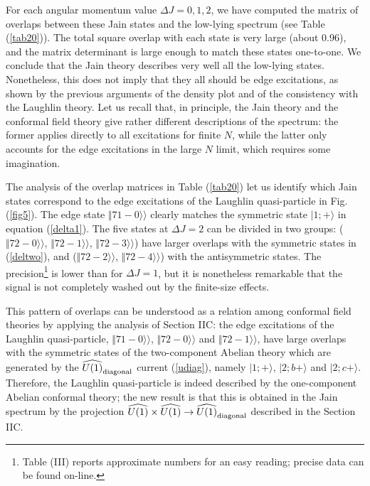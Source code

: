 For each angular momentum value $\Delta J=0,1,2$, we have computed 
the matrix of overlaps between these Jain states and the
low-lying spectrum (see Table (\ref{tab20})). The total square overlap with
each state is very large (about 0.96), and the matrix determinant 
is large enough to match these states one-to-one.
We conclude that the Jain theory describes very well all the 
low-lying states.
Nonetheless, this does not imply that they all should be
edge excitations, as shown by the previous arguments of the density
plot and of the consistency with the Laughlin theory.
Let us recall that, in principle, the Jain theory and the 
conformal field theory give rather different descriptions of the spectrum:
the former applies directly to all excitations for
finite $N$, while the latter only accounts for the edge excitations
in the large $N$ limit, which requires some imagination.

The analysis of the overlap matrices in Table (\ref{tab20}) let us identify
which Jain states correspond to the edge excitations of the Laughlin 
quasi-particle in Fig.(\ref{fig5}).
The edge state $\Vert 71-0\rangle\rangle$ clearly matches the symmetric
state $\vert 1;+\rangle$ in equation (\ref{delta1}). The five states
at $\Delta J=2$ can be divided in two groups: 
($\Vert 72-0\rangle\rangle$, 
$\Vert 72-1\rangle\rangle$, $\Vert 72-3\rangle\rangle$) have
larger overlaps with the symmetric states in (\ref{deltwo}),
and ($\Vert 72-2\rangle\rangle$, $\Vert 72-4\rangle\rangle$) with
the antisymmetric states. 
The precision\footnote{
Table (III) reports approximate numbers for an easy reading;
precise data can be found on-line.} 
is lower than for $\Delta J=1$,
but it is nonetheless remarkable that the signal is not 
completely washed out by the finite-size effects.

This pattern of overlaps can be understood as a relation among 
conformal field theories by applying the analysis of Section IIC:
the edge excitations of the Laughlin quasi-particle,
$\Vert 71-0\rangle\rangle$, 
$\Vert 72-0\rangle\rangle$ and $\Vert 72-1\rangle\rangle$,
have large overlaps with the symmetric states of the two-component Abelian
theory which are generated by the $\u1_{\rm diagonal}$ current
(\ref{udiag}), namely $\vert 1;+\rangle$, $\vert 2;b+\rangle$ and
$\vert 2;c +\rangle$.
Therefore, the Laughlin quasi-particle is indeed described by the
one-component Abelian conformal theory;
the new result is that this is obtained in the Jain spectrum 
by the projection $\u1\times\u1 \to \u1_{\rm diagonal}$
described in the Section IIC.


